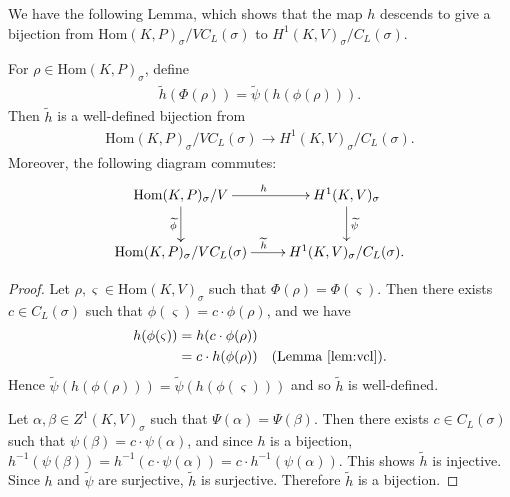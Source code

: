 	We have the following Lemma, which shows that the map $h$ descends to give a bijection from $\mathrm{Hom}(K, P)_\sigma /VC_L(\sigma)$ to $H^1(K, V)_{\sigma}/C_L(\sigma)$.

\begin{lemma}
	For $\rho \in \mathrm{Hom}(K, P)_\sigma$, define
	\begin{align*}
		\widetilde{h}(\Phi(\rho)) = \widetilde{\psi}(h(\phi(\rho))).
	\end{align*}
	Then $\widetilde{h}$ is a well-defined bijection from
	\begin{align*}
		\mathrm{Hom}(K, P)_\sigma / VC_L(\sigma) \rightarrow H^1(K, V)_\sigma/C_L(\sigma).
	\end{align*}
	Moreover, the following diagram commutes:
  \begin{align*}
    \xymatrix{
		\mathrm{Hom}(K, P)_{\sigma}/V \ar[r]^h \ar[d]_{\widetilde{\phi}} & H^{1}(K, V)_\sigma \ar[d]^{\widetilde{\psi}} \\
		\mathrm{Hom}(K, P)_{\sigma}/VC_L(\sigma) \ar[r]^{\widetilde{h}} & H^{1}(K, V)_\sigma/C_L(\sigma).
    }
  \end{align*}
\end{lemma}
\begin{proof}
Let $\rho, \varsigma \in \mathrm{Hom}(K, V)_\sigma$ such that $\Phi(\rho) = \Phi(\varsigma)$. Then there exists $c \in C_L(\sigma)$ such that $\phi(\varsigma) = c\cdot\phi(\rho)$, and we have
\begin{align*}
	h(\phi(\varsigma)) &= h(c \cdot\phi(\rho)) \\
	&= c \cdot h(\phi(\rho))\quad(\textrm{Lemma }\ref{lem:vcl}). 
\end{align*}
Hence $\widetilde{\psi}(h(\phi(\rho))) = \widetilde{\psi}(h(\phi(\varsigma)))$ and so $\widetilde{h}$ is well-defined.

Let $\alpha, \beta \in Z^1(K, V)_\sigma$ such that $\Psi(\alpha) = \Psi(\beta)$. Then there exists $c \in C_L(\sigma)$ such that $\psi(\beta) = c \cdot \psi(\alpha)$, and since $h$ is a bijection, $h^{-1}(\psi(\beta)) = h^{-1}(c \cdot \psi(\alpha)) = c \cdot h^{-1}(\psi(\alpha))$. This shows $\widetilde{h}$ is injective. Since $h$ and $\widetilde{\psi}$ are surjective, $\widetilde{h}$ is surjective. Therefore $\widetilde{h}$ is a bijection.
\end{proof}

